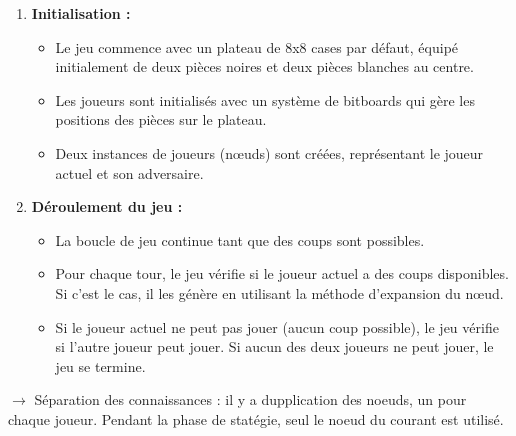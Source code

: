 \begin{enumerate}
    \item \textbf{Initialisation :}
    \begin{itemize}
        \item Le jeu commence avec un plateau de 8x8 cases par défaut, équipé initialement de deux pièces noires et deux pièces blanches au centre.
        \item Les joueurs sont initialisés avec un système de bitboards qui gère les positions des pièces sur le plateau.
        \item Deux instances de joueurs (nœuds) sont créées, représentant le joueur actuel et son adversaire.
    \end{itemize}
    
    \item \textbf{Déroulement du jeu :}
    \begin{itemize}
        \item La boucle de jeu continue tant que des coups sont possibles.
        \item Pour chaque tour, le jeu vérifie si le joueur actuel a des coups disponibles. Si c'est le cas, il les génère en utilisant la méthode d'expansion du nœud.
        \item Si le joueur actuel ne peut pas jouer (aucun coup possible), le jeu vérifie si l'autre joueur peut jouer. Si aucun des deux joueurs ne peut jouer, le jeu se termine.
    \end{itemize}
\end{enumerate}
$\rightarrow$ Séparation des connaissances : il y a dupplication des noeuds, un pour chaque joueur. Pendant la phase de statégie, seul le noeud du courant est utilisé.

